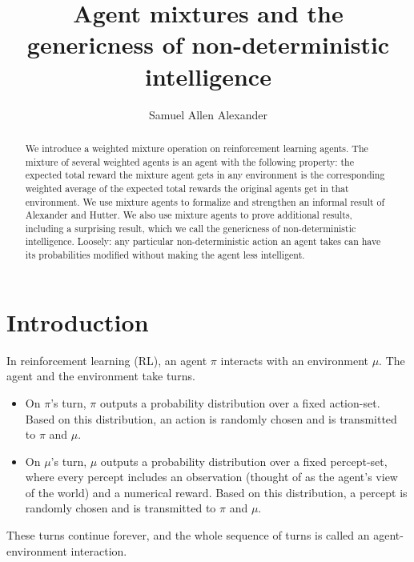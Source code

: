 \documentclass[runningheads]{llncs}
\begin{document}
\title{Agent mixtures and the genericness of non-deterministic intelligence}
\author{Samuel Allen
Alexander}


\maketitle

\begin{abstract}
    We introduce a weighted mixture operation on
    reinforcement learning agents. The mixture of several weighted agents is
    an agent with the
    following property: the expected total reward the mixture agent
    gets in any environment is the corresponding weighted average
    of the expected total rewards the original agents get in that
    environment. We use mixture agents to formalize and
    strengthen an informal result of Alexander and Hutter. We also use mixture
    agents to prove additional results, including a surprising result,
    which we call the genericness of non-deterministic intelligence. Loosely:
    any particular non-deterministic action an agent takes
    can have its probabilities modified without making the agent less
    intelligent.
\end{abstract}

\section{Introduction}

In reinforcement learning (RL), an agent $\pi$ interacts with an environment $\mu$.
The agent and the environment take turns.
\begin{itemize}
\item
On $\pi$'s turn, $\pi$
outputs a probability distribution over a fixed action-set.
Based on this distribution, an action is randomly chosen
and is transmitted to $\pi$ and $\mu$.
\item
On $\mu$'s turn, $\mu$
outputs a probability distribution over a fixed percept-set,
where every percept includes an observation (thought of as
the agent's view of the world) and a numerical reward.
Based on this distribution, a percept is randomly chosen and
is transmitted to $\pi$ and $\mu$.
\end{itemize}
These turns continue forever, and the whole sequence of turns
is called an agent-environment interaction.
\end{document}
